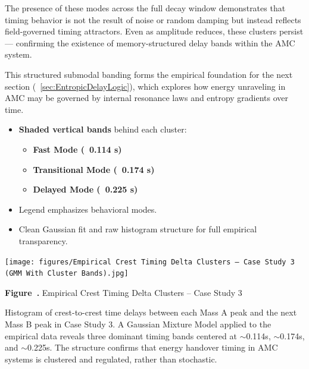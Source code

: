 \documentclass[10pt,aps,pre,onecolumn,superscriptaddress,notitlepage]{revtex4-2}
\renewcommand{\thefigure}{\arabic{figure}}
\begin{document}
The presence of these modes across the full decay window demonstrates that timing behavior is not the result of noise or random damping but instead reflects field-governed timing attractors. Even as amplitude reduces, these clusters persist — confirming the existence of memory-structured delay bands within the AMC system.

This structured submodal banding forms the empirical foundation for the next section (~\ref{sec:EntropicDelayLogic}), which explores how energy unraveling in AMC may be governed by internal resonance laws and entropy gradients over time.

\begin{itemize}
    \item \textbf{Shaded vertical bands} behind each cluster:
    
    \begin{itemize}
        \item 
            \textcolor{cyan!65!black}{\textbf{ Fast Mode (~0.114 s)}}
        
        
        \item 

            \textcolor{orange!90!black}{\textbf{ Transitional Mode (~0.174 s)}}
 
        
        \item 

            \textcolor{magenta!70!black}{\textbf{ Delayed Mode (~0.225 s)}}

    \end{itemize}

    \item Legend emphasizes behavioral modes.
    \item Clean Gaussian fit and raw histogram structure for full empirical transparency.
\end{itemize}

\begin{center}
  \texttt{[image: figures/Empirical Crest Timing Delta Clusters – Case Study 3 (GMM With Cluster Bands).jpg]}

  \smallskip
  \textbf{Figure~\thefigure.} Empirical Crest Timing Delta Clusters – Case Study 3  
  \small

  Histogram of crest-to-crest time delays between each Mass A peak and the next Mass B peak in Case Study 3. A Gaussian Mixture Model applied to the empirical data reveals three dominant timing bands centered at $\sim$0.114s, $\sim$0.174s, and $\sim$0.225s. The structure confirms that energy handover timing in AMC systems is clustered and regulated, rather than stochastic.
  \label{fig:histamc}
\end{center}
\end{document}
